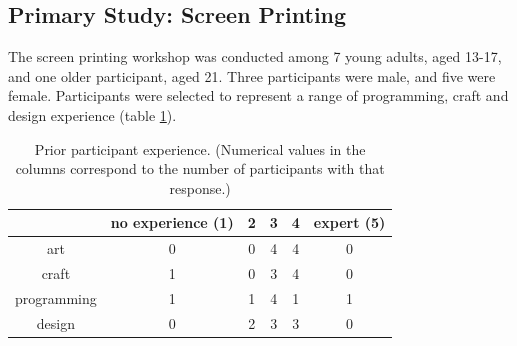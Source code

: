 \documentclass{sigchi}
\newcommand\tabhead[1]{\small\textbf{#1}}
\begin{document}
\subsection{Primary Study: Screen Printing}
The screen printing workshop was conducted among 7 young adults, aged 13-17, and one older participant, aged 21. Three participants were male, and five were female. Participants were selected to represent a range of programming, craft and design experience (table \ref{table:experience}).
\begin{table}
 \centering
 \begin{tabular}{|c|c|c|c|c|c|}
  \hline
  \multicolumn{1}{|p{0.75cm}|}{\centering\tabhead{}} &
  \multicolumn{1}{|p{1.3cm}|}{\centering\small{no experience (1)}} &
  \multicolumn{1}{|p{0.75cm}|}{\centering\small{2}}&
  \multicolumn{1}{|p{0.75cm}|}{\centering\small{3}}&
  \multicolumn{1}{|p{0.75cm}|}{\centering\small{4}}&
  \multicolumn{1}{|p{0.75cm}|}{\centering\small{expert (5)}}\\
  \hline
  \small{art} & 0 & 0 & 4 & 4 & 0\\
  \hline
  \small{craft} & 1 & 0 & 3 & 4& 0 \\
  \hline
 \small{programming} & 1 & 1 & 4 & 1& 1 \\
  \hline
 \small{design} & 0 & 2 & 3 & 3& 0 \\
  \hline
 \end{tabular}
 \caption{Prior participant experience. (Numerical values in the columns correspond to the number of participants with that response.)}
\label{table:experience}
\end{table}
\end{document}
